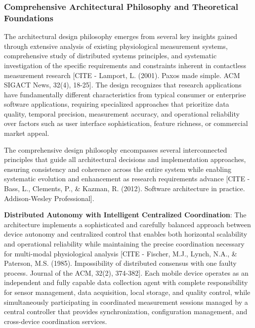 \documentclass[12pt,a4paper]{report}
\begin{document}
\subsubsection{Comprehensive Architectural Philosophy and Theoretical Foundations}

The architectural design philosophy emerges from several key insights gained through extensive analysis of existing
physiological measurement systems, comprehensive study of distributed systems principles, and systematic investigation
of the specific requirements and constraints inherent in contactless measurement
research [CITE - Lamport, L. (2001). Paxos made simple. ACM SIGACT News, 32(4), 18-25]. The design recognizes that
research applications have fundamentally different characteristics from typical consumer or enterprise software
applications, requiring specialized approaches that prioritize data quality, temporal precision, measurement accuracy,
and operational reliability over factors such as user interface sophistication, feature richness, or commercial market
appeal.

The comprehensive design philosophy encompasses several interconnected principles that guide all architectural decisions
and implementation approaches, ensuring consistency and coherence across the entire system while enabling systematic
evolution and enhancement as research requirements
advance [CITE - Bass, L., Clements, P., \& Kazman, R. (2012). Software architecture in practice. Addison-Wesley Professional].

\textbf{Distributed Autonomy with Intelligent Centralized Coordination}: The architecture implements a sophisticated and
carefully balanced approach between device autonomy and centralized control that enables both horizontal scalability and
operational reliability while maintaining the precise coordination necessary for multi-modal physiological
analysis [CITE - Fischer, M.J., Lynch, N.A., \& Paterson, M.S. (1985). Impossibility of distributed consensus with one faulty process. Journal of the ACM, 32(2), 374-382].
Each mobile device operates as an independent and fully capable data collection agent with complete responsibility for
sensor management, data acquisition, local storage, and quality control, while simultaneously participating in
coordinated measurement sessions managed by a central controller that provides synchronization, configuration
management, and cross-device coordination services.
\end{document}
